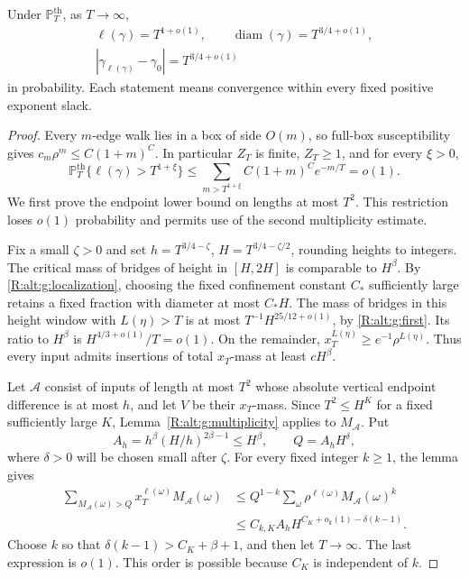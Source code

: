 \begin{proposition}
\label{R:alt:g:thermal}
Under $\mathbb P_T^{\mathrm{th}}$, as $T\to\infty$,
\[
 \begin{gathered}
 \ell(\gamma)=T^{1+o(1)},\qquad
 \operatorname{diam}(\gamma)=T^{3/4+o(1)},\\
 |\gamma_{\ell(\gamma)}-\gamma_0|=T^{3/4+o(1)}
 \end{gathered}
\]
in probability. Each statement means convergence within every fixed
positive exponent slack.
\end{proposition}
\begin{proof}
Every $m$-edge walk lies in a box of side $O(m)$, so full-box
susceptibility gives $c_m\rho^m\le C(1+m)^C$. In particular $Z_T$ is
finite, $Z_T\ge1$, and for every $\xi>0$,
\begin{equation}\label{R:alt:g:thermal-length-upper}
 \mathbb P_T^{\mathrm{th}}\{\ell(\gamma)>T^{1+\xi}\}
 \le\sum_{m>T^{1+\xi}}C(1+m)^Ce^{-m/T}=o(1).
\end{equation}
We first prove the endpoint lower bound on lengths at most $T^2$.
This restriction loses $o(1)$ probability and permits use of the second
multiplicity estimate.

Fix a small $\zeta>0$ and set
$h=T^{3/4-\zeta}$, $H=T^{3/4-\zeta/2}$, rounding heights to integers.
The critical mass of bridges of height in $[H,2H]$ is comparable to
$H^\beta$. By \eqref{R:alt:g:localization}, choosing the fixed
confinement constant $C_*$ sufficiently large retains a fixed fraction
with diameter at most $C_*H$. The mass of bridges in this height window
with $L(\eta)>T$ is at most $T^{-1}H^{25/12+o(1)}$, by
\eqref{R:alt:g:first}. Its ratio to $H^\beta$ is
$H^{4/3+o(1)}/T=o(1)$. On the remainder,
$x_T^{L(\eta)}\ge e^{-1}\rho^{L(\eta)}$. Thus every input admits
insertions of total $x_T$-mass at least $cH^\beta$.

Let $\mathcal A$ consist of inputs of length at most $T^2$ whose absolute
vertical endpoint difference is at most $h$, and let $V$ be their
$x_T$-mass. Since $T^2\le H^K$ for a fixed sufficiently large $K$,
Lemma~\ref{R:alt:g:multiplicity} applies to $M_{\mathcal A}$. Put
\[
 A_h=h^\beta(H/h)^{2\beta-1}\le H^\beta,
 \qquad Q=A_hH^\delta,
\]
where $\delta>0$ will be chosen small after $\zeta$. For every fixed
integer $k\ge1$, the lemma gives
\begin{align*}
 \sum_{M_{\mathcal A}(\omega)>Q}
       x_T^{\ell(\omega)}M_{\mathcal A}(\omega)
 &\le Q^{1-k}\sum_\omega
       \rho^{\ell(\omega)}M_{\mathcal A}(\omega)^k\\
 &\le C_{k,K}A_hH^{C_K+o_k(1)-\delta(k-1)}.
\end{align*}
Choose $k$ so that $\delta(k-1)>C_K+\beta+1$, and then let
$T\to\infty$. The last expression is $o(1)$. This order is possible
because $C_K$ is independent of $k$.


\end{proof}
